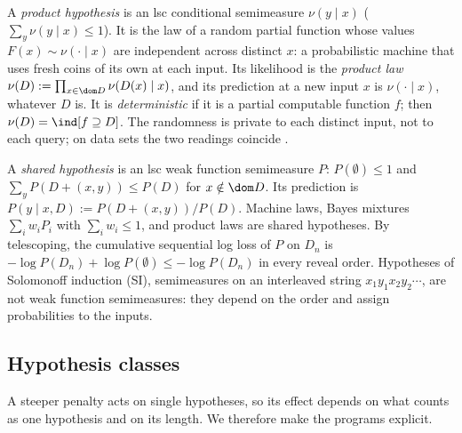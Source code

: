 \begin{definition}\label{def:setup:product}
A \emph{product hypothesis} is an lsc conditional semimeasure $\nu(y\mid x)$ ($\sum_y\nu(y\mid x)\le1$). It is the law of a random partial function whose values $F(x)\sim\nu(\cdot\mid x)$ are independent across distinct $x$: a probabilistic machine that uses fresh coins of its own at each input. Its likelihood is the \emph{product law} $\nu(D):=\prod_{x\in\dom D}\nu(D(x)\mid x)$, and its prediction at a new input $x$ is $\nu(\cdot\mid x)$, whatever $D$ is. It is \emph{deterministic} if it is a partial computable function $f$; then $\nu(D)=\ind[f\supseteq D]$. The randomness is private to each distinct input, not to each query; on data sets the two readings coincide \citep[the per-query proposition]{claudeSFI2026fundamentals}.
\end{definition}

\begin{definition}\label{def:setup:shared}
A \emph{shared hypothesis} is an lsc weak function semimeasure $P$: $P(\emptyset)\le1$ and $\sum_yP(D+(x,y))\le P(D)$ for $x\notin\dom D$. Its prediction is $P(y\mid x,D):=P(D+(x,y))/P(D)$. Machine laws, Bayes mixtures $\sum_iw_iP_i$ with $\sum_iw_i\le1$, and product laws are shared hypotheses. By telescoping, the cumulative sequential log loss of $P$ on $D_n$ is $-\log P(D_n)+\log P(\emptyset)\le-\log P(D_n)$ in every reveal order. Hypotheses of Solomonoff induction (SI), semimeasures on an interleaved string $x_1y_1x_2y_2\cdots$, are not weak function semimeasures: they depend on the order and assign probabilities to the inputs.
\end{definition}

\subsection{Hypothesis classes}\label{sec:setup:classes}

A steeper penalty acts on single hypotheses, so its effect depends on what counts as one hypothesis and on its length. We therefore make the programs explicit.

